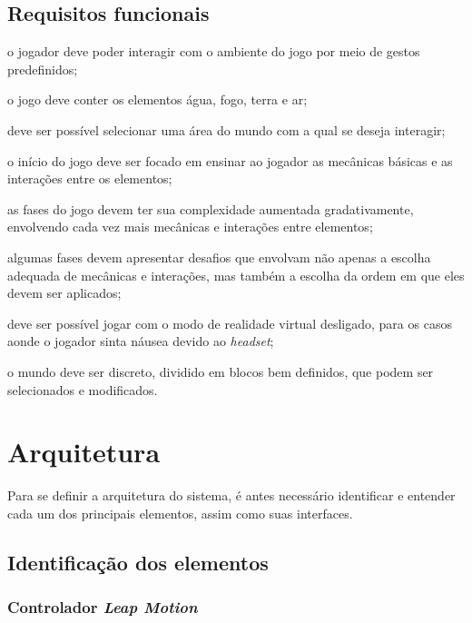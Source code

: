\subsection{Requisitos funcionais}\label{subsec-requisitos-funcionais}

\begin{alineas}
	\item o jogador deve poder interagir com o ambiente do jogo 
	 por meio de gestos predefinidos;
	\item o jogo deve conter os elementos água, fogo,
	 terra e ar;
	\item deve ser possível selecionar 
	 uma área do mundo com a qual se deseja interagir;
	\item o início do jogo deve ser focado em ensinar ao
	 jogador as mecânicas básicas e as interações entre os elementos;
	\item as fases do jogo devem ter sua complexidade aumentada
	 gradativamente, envolvendo cada vez mais mecânicas e
	 interações entre elementos;
	\item algumas fases devem apresentar desafios que envolvam
	 não apenas a escolha adequada de mecânicas e interações, 
	 mas também a escolha da ordem em que eles devem ser aplicados;
	
	\item deve ser possível jogar com o modo de realidade virtual
	 desligado, para os casos aonde o jogador sinta náusea 
	 devido ao \textit{headset}; 
	\item o mundo deve ser discreto, dividido em blocos bem
	 definidos, que podem ser selecionados e modificados.	
\end{alineas}

\section{Arquitetura}\label{sec-desenvolvimento-arquitetura}

Para se definir a arquitetura do sistema, é antes necessário identificar e 
entender cada um dos principais elementos, assim como suas interfaces.

\subsection{Identificação dos elementos}\label{subsec-identificacao-elementos}

\subsubsection{Controlador \textit{Leap Motion}}\label{subsubsec-elemento-leapmotion}


